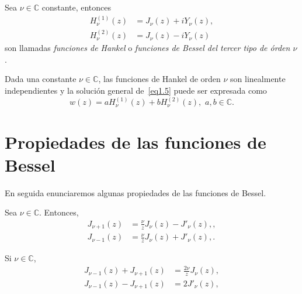 \documentclass[main.tex]{subfiles}
\begin{document}
\begin{def.}\label{d1.6} %
  Sea $\nu\in\mathbb{C}$ constante, entonces
  \begin{align}
    H_{\nu}^{(1)}(z)&=J_{\nu}(z)+iY_{\nu}(z),\label{eq1.9}\\
    H_{\nu}^{(2)}(z)&=J_{\nu}(z)-iY_{\nu}(z)\label{eq1.10}
  \end{align}
  son llamadas \textit{funciones de Hankel} o \textit{funciones de Bessel del tercer tipo de órden $\nu$}.
\end{def.}
\begin{prop}\label{p1.7} %
  Dada una constante $\nu\in\mathbb{C}$, las funciones de Hankel de orden $\nu$ son linealmente independientes y la solución general de~\eqref{eq1.5} puede ser expresada como
  \[
    w(z)=aH_{\nu}^{(1)}(z)+bH_{\nu}^{(2)}(z),\,\,a,b\in\mathbb{C}.
  \]
\end{prop}
\section{Propiedades de las funciones de Bessel}
\noindent En seguida enunciaremos algunas propiedades de las funciones de Bessel.
\begin{prop}\label{p1.8} %
  Sea $\nu\in\mathbb{C}$. Entonces,
  \begin{align}
    J_{\nu+1}(z)&=\frac{\nu}{z}J_{\nu}(z)-J'_{\nu}(z),\label{eq1.11},\\
    J_{\nu-1}(z)&=\frac{\nu}{z}J_{\nu}(z)+J'_{\nu}(z),\label{eq1.12}.
  \end{align}
\end{prop}
\begin{cor}\label{c.12} %
  Si $\nu\in\mathbb{C}$,
  \begin{align}
    J_{\nu-1}(z)+J_{\nu+1}(z)&=\frac{2\nu}{z}J_{\nu}(z),\label{eq1.13}\\
    J_{\nu-1}(z)-J_{\nu+1}(z)&=2J'_{\nu}(z),\label{eq1.14}
  \end{align}
\end{cor}
\end{document}
